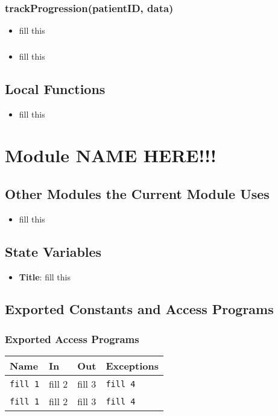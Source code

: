 \documentclass[12pt, titlepage]{article}
\begin{document}
\subsubsection{trackProgression(patientID, data)}

\begin{itemize}
    \item fill this
\end{itemize}

\subsubsection{}

\begin{itemize}
    \item fill this
\end{itemize}

\subsection{Local Functions}
\begin{itemize}
    \item fill this
\end{itemize}
\section{Module NAME HERE!!!}

\subsection{Other Modules the Current Module Uses}
\begin{itemize}
    \item fill this 
\end{itemize}

\subsection{State Variables}
\begin{itemize}
    \item \textbf{Title}: fill this 
\end{itemize}

\subsection{Exported Constants and Access Programs}
\subsubsection{Exported Access Programs}
\begin{tabular}{|l|l|l|l|}
    \hline
    \textbf{Name} & \textbf{In} & \textbf{Out} & \textbf{Exceptions} \\
    \hline 
    \texttt{fill 1} & fill 2 & fill 3 & \texttt{fill 4} \\
    \hline
    \texttt{fill 1} & fill 2 & fill 3 & \texttt{fill 4} \\
    \hline
\end{tabular}
\end{document}
